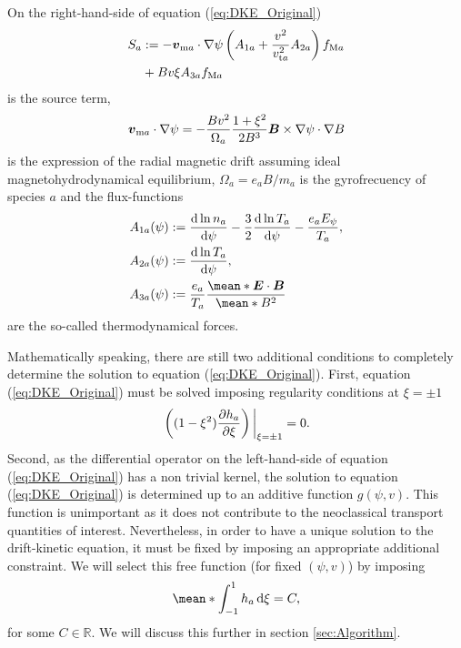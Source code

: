 \documentclass[10pt]{iopart}
\begin{document}
On the right-hand-side of equation (\ref{eq:DKE_Original}) 
%
\begin{align}
	S_a 
	& :=  
	- \vb*{v}_{\text{m} a} \cdot \nabla \psi 
	\left(
	A_{1a} 
	+  \frac{v^2}{v_{\text{t}a}^2}
	A_{2a}
	\right)
	f_{\text{M}a}
	\nonumber \\ 
	& + 
	B v \xi A_{3a}f_{\text{M}a}
	\label{eq:DKE_Original_Source}
\end{align}
is the source term, 
\begin{align}
	\vb*{v}_{\text{m} a}\cdot\nabla\psi
	=
	-\frac{Bv^2}{\Omega_a}
	\frac{1+\xi^2}{2B^3}
	\vb*{B}\times\nabla\psi \cdot \nabla B 
\end{align}
is the expression of the radial magnetic drift assuming ideal magnetohydrodynamical equilibrium, $\Omega_a = e_a B / m_a$ is the gyrofrecuency of species $a$ and the flux-functions 
%
\begin{align}
	A_{1a}(\psi) & := \dv{\ln n_a}{\psi} - \frac{3}{2} \dv{\ln T_a}{\psi} - \frac{e_a E_\psi}{T_a}, 
	\\
	A_{2a}(\psi) & := \dv{\ln T_a}{\psi} , 
	\\
	A_{3a}(\psi) & :=  \frac{e_a }{T_a} \frac{\mean*{\vb*{E}\cdot\vb*{B}}}{\mean*{B^2}}
\end{align}
are the so-called thermodynamical forces.

Mathematically speaking, there are still two additional conditions to completely determine the solution to equation (\ref{eq:DKE_Original}). First, equation (\ref{eq:DKE_Original}) must be solved imposing regularity conditions at $\xi =\pm 1$
%
\begin{align}
	\eval{\left((1-\xi^2) \pdv{h_a}{\xi}\right)}_{\xi =\pm 1} = 0.
	\label{eq:Regularity_conditions}
\end{align}
Second, as the differential operator on the left-hand-side of equation (\ref{eq:DKE_Original}) has a non trivial kernel, the solution to equation (\ref{eq:DKE_Original}) is determined up to an additive function $g(\psi,v)$. This function is unimportant as it does not contribute to the neoclassical transport quantities of interest. Nevertheless, in order to have a unique solution to the drift-kinetic equation, it must be fixed by imposing an appropriate additional constraint. We will select this free function (for fixed $(\psi,v)$) by imposing
%
\begin{align}
	\mean*{  \int_{-1}^{1} h_a \dd{\xi}  } = C,
	\label{eq:kernel_elimination_condition}
\end{align}
for some $C\in\mathbb{R}$. We will discuss this further in section \ref{sec:Algorithm}. 
\end{document}
